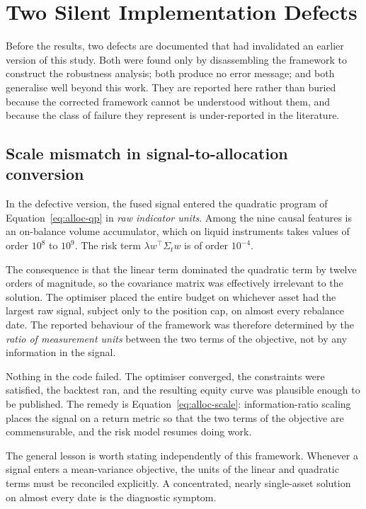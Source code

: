 \section{Two Silent Implementation Defects}
\label{sec:alloc-defects}

Before the results, two defects are documented that had invalidated an earlier version of this
study. Both were found only by disassembling the framework to construct the robustness analysis;
both produce no error message; and both generalise well beyond this work. They are reported here
rather than buried because the corrected framework cannot be understood without them, and because
the class of failure they represent is under-reported in the literature.

\subsection{Scale mismatch in signal-to-allocation conversion}

In the defective version, the fused signal entered the quadratic program of
Equation~\eqref{eq:alloc-qp} in \emph{raw indicator units}. Among the nine causal features is an
on-balance volume accumulator, which on liquid instruments takes values of order $10^{8}$ to
$10^{9}$. The risk term $\lambda w^{\!\top}\Sigma_t w$ is of order $10^{-4}$.

The consequence is that the linear term dominated the quadratic term by twelve orders of
magnitude, so the covariance matrix was effectively irrelevant to the solution. The optimiser
placed the entire budget on whichever asset had the largest raw signal, subject only to the
position cap, on almost every rebalance date. The reported behaviour of the framework was therefore
determined by the \emph{ratio of measurement units} between the two terms of the objective, not by
any information in the signal.

Nothing in the code failed. The optimiser converged, the constraints were satisfied, the backtest
ran, and the resulting equity curve was plausible enough to be published. The remedy is
Equation~\eqref{eq:alloc-scale}: information-ratio scaling places the signal on a return metric so
that the two terms of the objective are commensurable, and the risk model resumes doing work.

The general lesson is worth stating independently of this framework. Whenever a signal enters a
mean-variance objective, the units of the linear and quadratic terms must be reconciled
explicitly. A concentrated, nearly single-asset solution on almost every date is the diagnostic
symptom.

